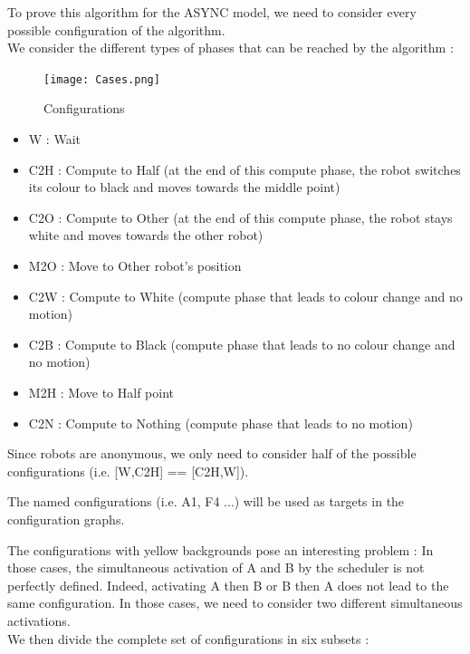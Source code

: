 \documentclass[11pt]{article}
\begin{document}
To prove this algorithm for the ASYNC model, we need to consider every possible configuration of the algorithm.
\\
We consider the different types of phases that can be reached by the algorithm : 
\begin{figure}[H]
	\centering
	\texttt{[image: Cases.png]}
	\caption{Configurations}
\end{figure}

\begin{itemize}
\item W : Wait
\item C2H : Compute to Half (at the end of this compute phase, the robot switches its colour to black and moves towards the middle point)
\item C2O : Compute to Other (at the end of this compute phase, the robot stays white and moves towards the other robot)
\item M2O : Move to Other robot's position
\item C2W : Compute to White (compute phase that leads to colour change and no motion)
\item C2B : Compute to Black (compute phase that leads to no colour change and no motion)
\item M2H : Move to Half point
\item C2N : Compute to Nothing (compute phase that leads to no motion)
\end{itemize}

Since robots are anonymous, we only need to consider half of the possible configurations (i.e. [W,C2H] == [C2H,W]). 

The named configurations (i.e. A1, F4 ...) will be used as targets in the configuration graphs. 

The configurations with yellow backgrounds pose an interesting problem :
In those cases, the simultaneous activation of A and B by the scheduler is not perfectly defined. Indeed, activating A then B or B then A does not lead to the same configuration. In those cases, we need to consider two different simultaneous activations.
\\

We then divide the complete set of configurations in six subsets :
\end{document}
